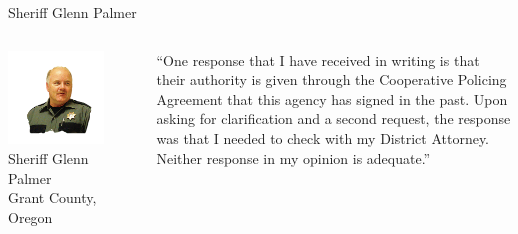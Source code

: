 
% 
\begin{frame}{Sheriff Glenn Palmer}
    \begin{columns}[onlytextwidth]
            \centering
            \includegraphics[width=0.75\textwidth]{img/glenn-palmer.png}
            \\ Sheriff Glenn Palmer
            \\ Grant County, Oregon

            ``One response that I have received in writing is that their
            authority is given through the Cooperative Policing Agreement that
            this agency has signed in the past. Upon asking for clarification
            and a second request, the response was that I needed to check with
            my District Attorney. Neither response in my opinion is adequate.''
    \end{columns}
\end{frame}

